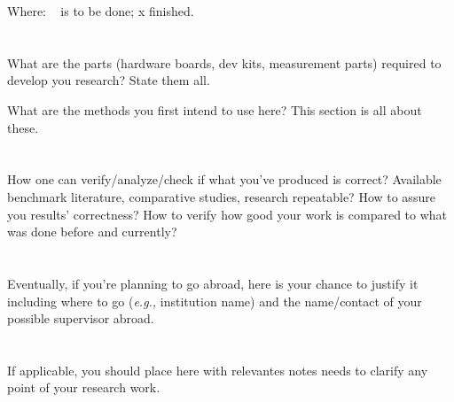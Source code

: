 \documentclass[12pt, a4paper]{article}
\begin{document}
Where: \ck~ is to be done; x  finished.


\section{\sectionVI}
\label{sec:materiais-metodos}
What are the parts (hardware boards, dev kits, measurement parts) required to develop you research? State them all.

What are the methods you first intend to use here? This section is all about these.

\section{\sectionVII}
\label{sec:analise-resultados}

How one can verify/analyze/check if what you've produced is correct? Available benchmark literature, comparative studies, research repeatable? How to assure you results' correctness? How to verify how good your work is compared to what was done before and currently?


\section{\sectionVIII}
\label{sec:pesquisa-exterior}
Eventually, if you're planning to go abroad, here is your chance to justify it including where to go (\textit{e.g.,} institution name) and the name/contact of your possible supervisor abroad.

\section{\sectionIX}
\label{sec:general-notes}
If applicable, you should place here with relevantes notes needs to clarify any point of your research work.




\listoftodos
\end{document}
